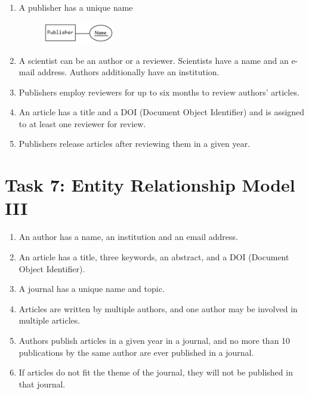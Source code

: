 \documentclass{article}
\begin{document}
\begin{enumerate}
\item A publisher has a unique name

\begin{figure}[h]
\centering
\includegraphics[width=0.3\textwidth]{6.1.png}
\end{figure}

\item A scientist can be an author or a reviewer. Scientists have a name and an e-mail address.
Authors additionally have an institution.

\item Publishers employ reviewers for up to six months to review authors’ articles.

\item An article has a title and a DOI (Document Object Identifier) and is assigned to at least one
reviewer for review.

\item Publishers release articles after reviewing them in a given year.
\end{enumerate}



\section*{Task 7: Entity Relationship Model III}
\begin{enumerate}
\item An author has a name, an institution and an email address.

\item An article has a title, three keywords, an abstract, and a DOI (Document Object Identifier).

\item A journal has a unique name and topic.

\item Articles are written by multiple authors, and one author may be involved in multiple articles.

\item Authors publish articles in a given year in a journal, and no more than 10 publications by
the same author are ever published in a journal.

\item If articles do not fit the theme of the journal, they will not be published in that journal.
\end{enumerate}


\printbibliography
\end{document}
